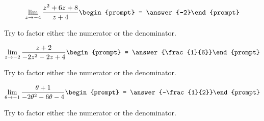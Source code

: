 \documentclass[handout]{ximera}
\begin{document}
\begin{exercise}
\[
\lim_{z\to -4 } \frac{z^2+6 z+8}{z+4}\begin{prompt} = \answer{-2}\end{prompt}
\]
\begin{hint}
Try to factor either the numerator or the denominator.
\end{hint}
\end{exercise}

\begin{exercise}
\[
\lim_{z\to -2 } \frac{z+2}{-2 z^2-2 z+4}\begin{prompt} = \answer{\frac{1}{6}}\end{prompt}
\]
\begin{hint}
Try to factor either the numerator or the denominator.
\end{hint}
\end{exercise}


\begin{exercise}
\[
\lim_{\theta\to -1 } \frac{\theta +1}{-2 \theta ^2-6 \theta -4}\begin{prompt} = \answer{-\frac{1}{2}}\end{prompt}
\]
\begin{hint}
Try to factor either the numerator or the denominator.
\end{hint}
\end{exercise}
\end{document}

